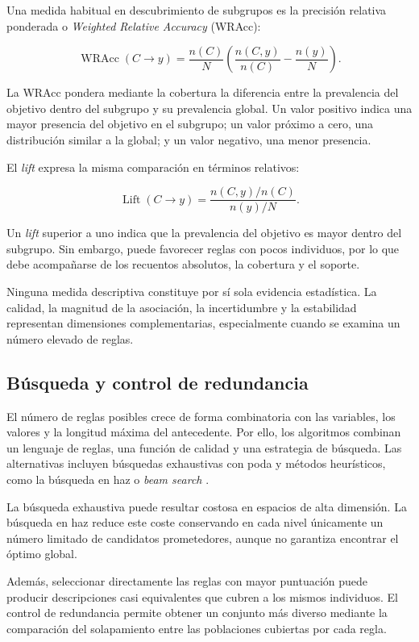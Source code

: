 Una medida habitual en descubrimiento de subgrupos es la precisión relativa ponderada o \textit{Weighted Relative Accuracy} (WRAcc):

\[
\operatorname{WRAcc}(C\rightarrow y)
=
\frac{n(C)}{N}
\left(
\frac{n(C,y)}{n(C)}
-
\frac{n(y)}{N}
\right).
\]

La WRAcc pondera mediante la cobertura la diferencia entre la prevalencia del objetivo dentro del subgrupo y su prevalencia global. Un valor positivo indica una mayor presencia del objetivo en el subgrupo; un valor próximo a cero, una distribución similar a la global; y un valor negativo, una menor presencia.

El \textit{lift} expresa la misma comparación en términos relativos:

\[
\operatorname{Lift}(C\rightarrow y)
=
\frac{n(C,y)/n(C)}{n(y)/N}.
\]

Un \textit{lift} superior a uno indica que la prevalencia del objetivo es mayor dentro del subgrupo. Sin embargo, puede favorecer reglas con pocos individuos, por lo que debe acompañarse de los recuentos absolutos, la cobertura y el soporte.

Ninguna medida descriptiva constituye por sí sola evidencia estadística. La calidad, la magnitud de la asociación, la incertidumbre y la estabilidad representan dimensiones complementarias, especialmente cuando se examina un número elevado de reglas.

\subsection{Búsqueda y control de redundancia}

El número de reglas posibles crece de forma combinatoria con las variables, los valores y la longitud máxima del antecedente. Por ello, los algoritmos combinan un lenguaje de reglas, una función de calidad y una estrategia de búsqueda. Las alternativas incluyen búsquedas exhaustivas con poda y métodos heurísticos, como la búsqueda en haz o \textit{beam search} \cite{Herrera2011,Atzmueller2015}.

La búsqueda exhaustiva puede resultar costosa en espacios de alta dimensión. La búsqueda en haz reduce este coste conservando en cada nivel únicamente un número limitado de candidatos prometedores, aunque no garantiza encontrar el óptimo global.

Además, seleccionar directamente las reglas con mayor puntuación puede producir descripciones casi equivalentes que cubren a los mismos individuos. El control de redundancia permite obtener un conjunto más diverso mediante la comparación del solapamiento entre las poblaciones cubiertas por cada regla.

